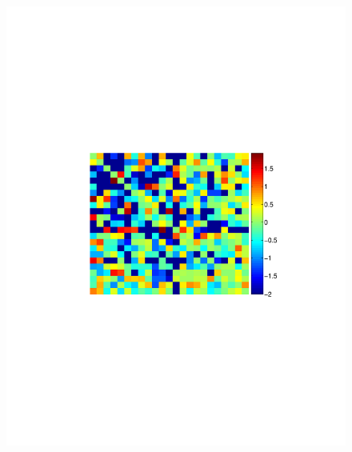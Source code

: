 \begin{figure}[h]
\begin{minipage}[c]{0.3\hsize}
\includegraphics[width=\hsize]{../figs/FigureA11_real_glm}
\end{minipage}
\begin{minipage}[c]{0.3\hsize}

\end{minipage}
\end{figure}

